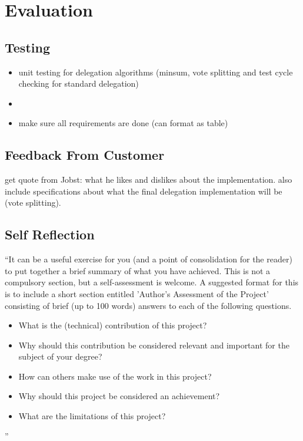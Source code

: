 \chapter{Evaluation}\label{ch:evaluation}

\section{Testing}
\begin{itemize}
    \item unit testing for delegation algorithms (minsum, vote splitting and test cycle checking for standard delegation)
    \item 
    \item make sure all requirements are done (can format as table)
\end{itemize}
\section{Feedback From Customer}
get quote from Jobst: what he likes and dislikes about the implementation. also include specifications about what the final delegation implementation will be (vote splitting).
\section{Self Reflection}
``It can be a useful exercise for you (and a point of consolidation for the reader) to put together a brief summary of what you have achieved. This is not a compulsory section, but a self-assessment is welcome. A suggested format for this is to include a short section entitled 'Author's Assessment of the Project' consisting of brief (up to 100 words) answers to each of the following questions.

\begin{itemize}
\item What is the (technical) contribution of this project?
\item Why should this contribution be considered relevant and important for the subject of your degree?
\item How can others make use of the work in this project?
\item Why should this project be considered an achievement?
\item What are the limitations of this project?
\end{itemize}''